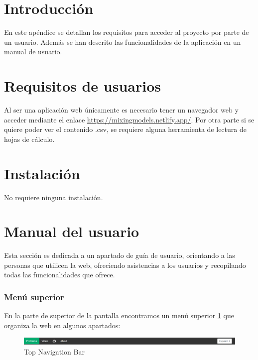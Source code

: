 
\section{Introducción}

En este apéndice se detallan los requisitos para acceder al proyecto por parte de un usuario. Además se han descrito las funcionalidades de la aplicación en un manual de usuario.

\section{Requisitos de usuarios}

Al ser una aplicación web únicamente es necesario tener un navegador web y acceder mediante el enlace \url{https://mixingmodels.netlify.app/}. Por otra parte si se quiere poder ver el contenido .csv, se requiere alguna herramienta de lectura de hojas de cálculo.

\section{Instalación}

No requiere ninguna instalación.

\section{Manual del usuario}

Esta sección es dedicada a un apartado de guía de usuario, orientando a las personas que utilicen la web, ofreciendo asistencias a los usuarios y recopilando todas las funcionalidades que ofrece.

\subsubsection{Menú superior}

En la parte de superior de la pantalla encontramos un menú superior \ref{fig:topnav} que organiza la web en algunos apartados:

\begin{figure}[h!] 
\centering
    \includegraphics[width=1\textwidth]{img/menu_sup.PNG}
\caption{Top Navigation Bar}
\label{fig:topnav}
\end{figure}

